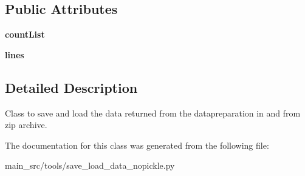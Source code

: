 \subsection*{Public Attributes}
\begin{DoxyCompactItemize}
\item 
\hypertarget{classmain__src_1_1tools_1_1save__load__data__nopickle_1_1SaveLoad_a09095c7268c6bc08af85c7f0e4673acc}{{\bfseries count\-List}}\label{classmain__src_1_1tools_1_1save__load__data__nopickle_1_1SaveLoad_a09095c7268c6bc08af85c7f0e4673acc}

\item 
\hypertarget{classmain__src_1_1tools_1_1save__load__data__nopickle_1_1SaveLoad_a7fa32779739577c55d345c7c717b13a2}{{\bfseries lines}}\label{classmain__src_1_1tools_1_1save__load__data__nopickle_1_1SaveLoad_a7fa32779739577c55d345c7c717b13a2}

\end{DoxyCompactItemize}


\subsection{Detailed Description}
Class to save and load the data returned from the datapreparation in and from zip archive. 

The documentation for this class was generated from the following file\-:\begin{DoxyCompactItemize}
\item 
main\-\_\-src/tools/save\-\_\-load\-\_\-data\-\_\-nopickle.\-py\end{DoxyCompactItemize}
